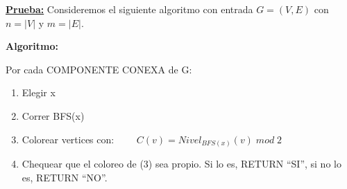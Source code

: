\documentclass[12pt,a4paper]{report}
\providecommand{\abs}[1]{\lvert#1\rvert}
\begin{document}
		\textbf{\underline{Prueba:}} Consideremos el siguiente algoritmo con entrada $G = (V, E)$ con $n = \abs{V}$ y $m = \abs{E}$.

			\vspace{5mm}
			\par \textbf{Algoritmo:}
			\par Por cada COMPONENTE CONEXA de G:
				\begin{enumerate}
					\item Elegir x
					\item Correr BFS(x)
					\item Colorear vertices con: $\qquad	C(v) = Nivel_{BFS(x)}(v) \; mod \; 2$
					\item Chequear que el coloreo de (3) sea propio. Si lo es, RETURN \textquotedblleft SI\textquotedblright, si no lo es, RETURN \textquotedblleft NO\textquotedblright.
				\end{enumerate}
\end{document}
